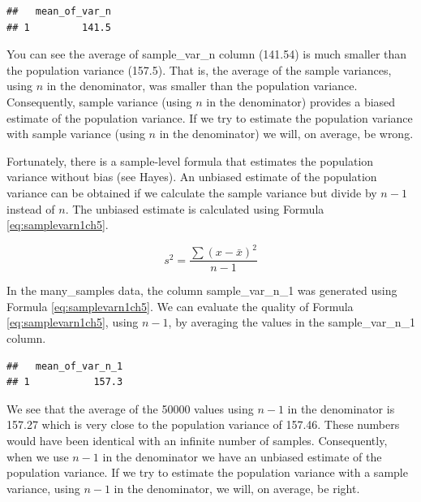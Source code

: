 \documentclass[
]{krantz}
\makeatletter
\newenvironment{Shaded}{\begin{snugshade}}{\end{snugshade}}
\newcommand{\DataTypeTok}[1]{\textcolor[rgb]{0.27,0.27,0.27}{#1}}
\newcommand{\DecValTok}[1]{\textcolor[rgb]{0.06,0.06,0.06}{#1}}
\newcommand{\KeywordTok}[1]{\textcolor[rgb]{0.27,0.27,0.27}{\textbf{#1}}}
\newcommand{\NormalTok}[1]{#1}
\newcommand{\OperatorTok}[1]{\textcolor[rgb]{0.43,0.43,0.43}{\textbf{#1}}}
\newcommand{\StringTok}[1]{\textcolor[rgb]{0.5,0.5,0.5}{#1}}
\newenvironment{kframe}{%
\medskip{}
\setlength{\fboxsep}{.8em}
 \def\at@end@of@kframe{}%
 \ifinner\ifhmode%
  \def\at@end@of@kframe{\end{minipage}}%
  \begin{minipage}{\columnwidth}%
 \fi\fi%
 \def\FrameCommand##1{\hskip\@totalleftmargin \hskip-\fboxsep
 \colorbox{shadecolor}{##1}\hskip-\fboxsep
     \hskip-\linewidth \hskip-\@totalleftmargin \hskip\columnwidth}%
 \MakeFramed {\advance\hsize-\width
   \@totalleftmargin\z@ \linewidth\hsize
   \@setminipage}}%
 {\par\unskip\endMakeFramed%
 \at@end@of@kframe}
\renewenvironment{Shaded}{\begin{kframe}}{\end{kframe}}
\makeatother
\begin{document}
\begin{verbatim}
##   mean_of_var_n
## 1         141.5
\end{verbatim}

You can see the average of sample\_var\_n column (141.54) is much smaller than the population variance (157.5). That is, the average of the sample variances, using \(n\) in the denominator, was smaller than the population variance. Consequently, sample variance (using \(n\) in the denominator) provides a biased estimate of the population variance. If we try to estimate the population variance with sample variance (using \(n\) in the denominator) we will, on average, be wrong.

Fortunately, there is a sample-level formula that estimates the population variance without bias (see Hayes). An unbiased estimate of the population variance can be obtained if we calculate the sample variance but divide by \(n - 1\) instead of \(n\). The unbiased estimate is calculated using Formula \eqref{eq:samplevarn1ch5}.

\begin{equation} 
s^2 = \frac{\sum{(x - \bar{x})^2}}{n-1}
      \label{eq:samplevarn1ch5}
\end{equation}

In the many\_samples data, the column sample\_var\_n\_1 was generated using Formula \eqref{eq:samplevarn1ch5}. We can evaluate the quality of Formula \eqref{eq:samplevarn1ch5}, using \(n-1\), by averaging the values in the sample\_var\_n\_1 column.

\begin{Shaded}
\end{Shaded}

\begin{verbatim}
##   mean_of_var_n_1
## 1           157.3
\end{verbatim}

We see that the average of the 50000 values using \(n-1\) in the denominator is 157.27 which is very close to the population variance of 157.46. These numbers would have been identical with an infinite number of samples. Consequently, when we use \(n-1\) in the denominator we have an unbiased estimate of the population variance. If we try to estimate the population variance with a sample variance, using \(n-1\) in the denominator, we will, on average, be right.
\end{document}
